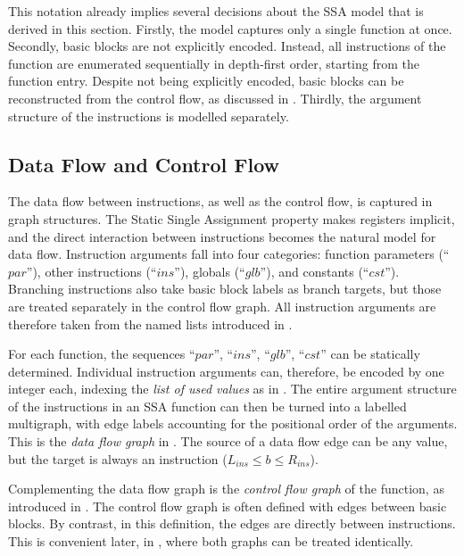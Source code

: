     This notation already implies several decisions about the SSA model that is
    derived in this section.
    Firstly, the model captures only a single function at once.
    Secondly, basic blocks are not explicitly encoded.
    Instead, all instructions of the function are enumerated sequentially in
    depth-first order, starting from the function entry.
    Despite not being explicitly encoded, basic blocks can be reconstructed from
    the control flow, as discussed in .
    Thirdly, the argument structure of the instructions is modelled separately.

\subsection{Data Flow and Control Flow}
\label{sec:derivingamodel}

    The data flow between instructions, as well as the control flow, is captured
    in graph structures.
    The Static Single Assignment property makes registers implicit, and the
    direct interaction between instructions becomes the natural model for data
    flow.
    Instruction arguments fall into four categories: function parameters
    (``$par$''), other instructions (``$ins$''), globals (``$glb$''), and
    constants (``$cst$'').
    Branching instructions also take basic block labels as branch targets,
    but those are treated separately in the control flow graph.
    All instruction arguments are therefore taken from the named lists
    introduced in .

    For each function, the sequences ``$par$'', ``$ins$'', ``$glb$'', ``$cst$''
    can be statically determined.
    Individual instruction arguments can, therefore, be encoded by one integer
    each, indexing the {\it list of used values} as in .
    The entire argument structure of the instructions in an SSA
    function can then be turned into a labelled multigraph, with edge labels
    accounting for the positional order of the arguments.
    This is the {\it data flow graph} in .
    The source of a data flow edge can be any value, but the target is
    always an instruction ($L_{ins}\leq b\leq R_{ins}$).

    Complementing the data flow graph is the {\em control flow graph} of the
    function, as introduced in .
    The control flow graph is often defined with edges between basic blocks.
    By contrast, in this definition, the edges are directly between
    instructions.
    This is convenient later, in
    , where both graphs
    can be treated identically.

